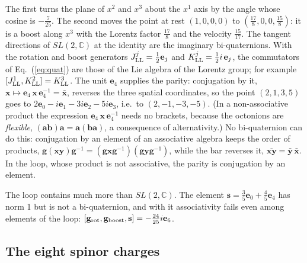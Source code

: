 \documentclass[aps,prd,twocolumn,superscriptaddress,nofootinbib,floatfix,longbibliography]{revtex4-2}
\newcommand{\LL}{{\rm LL}}
\newcommand{\e}[1]{\mathbf e_{#1}}
\begin{document}
The first turns the plane of $x^2$ and $x^3$ about the $x^1$ axis by the angle whose cosine is $-\frac7{25}$. The second
moves the point at rest $(1,0,0,0)$ to $(\tfrac{17}{8},0,0,\tfrac{15}{8})$: it is a boost along $x^3$ with the Lorentz factor
$\frac{17}8$ and the velocity $\frac{15}{17}$.
The tangent directions of $SL(2,\mathbb C)$ at the identity are the imaginary bi-quaternions. With the rotation and boost
generators $J^j_\LL=\frac12\e j$ and $K^j_\LL=\frac12i\,\e j$, the commutators of Eq.~(\ref{eq:quat}) are those of the
Lie algebra of the Lorentz group; for example $[J^1_\LL,K^2_\LL]=K^3_\LL$. The unit $\e4$ supplies the
parity: conjugation by it, $\mathbf x\mapsto\e4\,\mathbf x\,\e4^{-1}=\bar{\mathbf x}$, reverses the three spatial
coordinates, so the point $(2,1,3,5)$ goes to $2\e{0}-i\e{1}-3i\e{2}-5i\e{3}$, i.e.\ to $(2,-1,-3,-5)$. (In a
non-associative product the expression $\e4\,\mathbf x\,\e4^{-1}$ needs no brackets, because the octonions are
\emph{flexible}, $(\mathbf a\mathbf b)\mathbf a=\mathbf a(\mathbf b\mathbf a)$, a consequence of alternativity.) No
bi-quaternion can do this: conjugation by an element of an associative algebra keeps the order of products,
$\mathbf g(\mathbf x\mathbf y)\mathbf g^{-1}=(\mathbf g\mathbf x\mathbf g^{-1})(\mathbf g\mathbf y\mathbf g^{-1})$, while
the bar reverses it, $\overline{\mathbf x\mathbf y}=\bar{\mathbf y}\,\bar{\mathbf x}$. In the loop, whose product is not
associative, the parity is conjugation by an element.

The loop contains much more than $SL(2,\mathbb C)$. The element $\mathbf s=\tfrac{3}{5}\e{0}+\tfrac{4}{5}\e{4}$ has norm 1 but is not a
bi-quaternion, and with it associativity fails even among elements of the loop:
$[\mathbf g_{\rm rot},\mathbf g_{\rm boost},\mathbf s]=-\tfrac{24}{25}i\e{6}$.

\subsection{The eight spinor charges}
\label{sec:charges}
\end{document}
